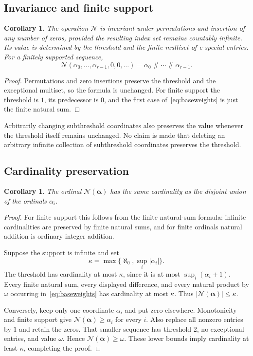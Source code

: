 \documentclass[11pt,a4paper]{article}
\newtheorem{corollary}[theorem]{Corollary}
\theoremstyle{definition}
\newcommand{\ns}{\mathbin{\#}}
\newcommand{\OpN}{\mathcal N}
\newcommand{\seq}[1]{\boldsymbol{#1}}
\begin{document}
\subsection{Invariance and finite support}

\begin{corollary}\label{block:cor:invariance}
The operation $\OpN$ is invariant under permutations and insertion of any number of zeros, provided the resulting index set remains countably infinite. Its value is determined by the threshold and the finite multiset of e-special entries. For a finitely supported sequence,
\[
 \OpN(\alpha_0,\ldots,\alpha_{r-1},0,0,\ldots)
   =\alpha_0\ns\cdots\ns\alpha_{r-1}.
\]
\end{corollary}
\begin{proof}
Permutations and zero insertions preserve the threshold and the exceptional multiset, so the formula is unchanged. For finite support the threshold is $1$, its predecessor is $0$, and the first case of~\eqref{eq:baseweights} is just the finite natural sum.
\end{proof}

Arbitrarily changing subthreshold coordinates also preserves the value whenever the threshold itself remains unchanged. No claim is made that deleting an arbitrary infinite collection of subthreshold coordinates preserves the threshold.

\subsection{Cardinality preservation}

\begin{corollary}\label{block:cor:cardinality}
The ordinal $\OpN(\seq\alpha)$ has the same cardinality as the disjoint union of the ordinals $\alpha_i$.
\end{corollary}
\begin{proof}
For finite support this follows from the finite natural-sum formula: infinite cardinalities are preserved by finite natural sums, and for finite ordinals natural addition is ordinary integer addition.

Suppose the support is infinite and set
\[
 \kappa=\max\{\aleph_0,\sup_i|\alpha_i|\}.
\]
The threshold has cardinality at most $\kappa$, since it is at most $\sup_i(\alpha_i+1)$. Every finite natural sum, every displayed difference, and every natural product by $\omega$ occurring in~\eqref{eq:baseweights} has cardinality at most $\kappa$. Thus $|\OpN(\seq\alpha)|\le\kappa$.

Conversely, keep only one coordinate $\alpha_i$ and put zero elsewhere. Monotonicity and finite support give $\OpN(\seq\alpha)\ge\alpha_i$ for every $i$. Also replace all nonzero entries by $1$ and retain the zeros. That smaller sequence has threshold $2$, no exceptional entries, and value $\omega$. Hence $\OpN(\seq\alpha)\ge\omega$. These lower bounds imply cardinality at least $\kappa$, completing the proof.
\end{proof}
\end{document}
